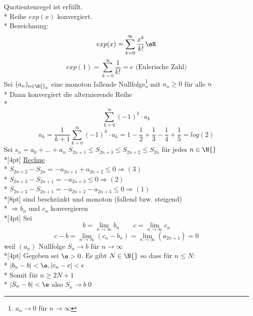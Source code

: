 \Rarr{} Quotientenregel ist erfüllt.\\*
Reihe $exp(x)$ konvergiert.\\*
Bezeichnung: $$exp(x) = \sum_{k=0}^{\infty} \frac{x^k}{k!} \eR$$
%
$$exp(1) = \sum\limits_{k=0}^{\infty} \frac{1}{k!} = e\text{ (Eulerische Zahl)}$$
Sei $(a_n)_{n \in \N{}_0}$ eine monoton fallende Nullfolge\footnote{$a_n → 0$ für $n→∞$} mit $a_n \geq 0$ für alle $n$\\*
Dann konvergiert die alternierende Reihe\\*
$$\sum_{k=0}^{\infty} (-1)^k · a_k$$
\bsp
$$a_k = \frac{1}{k + 1} \sum_{k=0}^{\infty} (-1)^k · a_k = 1 - \frac{1}{2} + \frac{1}{3} - \frac{1}{4} + \frac{1}{5}= log(2)$$
\bew
Sei $s_n = a_0 + ... + a_n$
$S_{2n + 1} \leq S_{2n + 3} \leq S_{2n + 2} \leq S_{2n}$ für jedes $n \in \N{}$\\*[4pt]
\ul{Rechne}\\*
$S_{2n + 2} - S_{2n} = - a_{2n + 1} + a_{2n + 2} \leq 0 \Rightarrow (3)$\\*
$S_{2n + 3} - S_{2n + 1} = - a_{2n + 3} \leq 0 \Rightarrow (2)$\\*
$S_{2n + 3} - S_{2n + 1} = - a_{2n + 2} - a_{2n + 3} \leq 0 \Rightarrow (1)$\\*[8pt]
sind beschränkt und monoton (fallend bzw. steigend)\\*
$\Rightarrow b_n \text{ und } c_n$ konvergieren\\*[4pt]
Sei $$b = \lim_{n \to \infty} b_n \qquad c = \lim_{n \to \infty} c_n$$
$$c - b = \lim_{n \to \infty} (c_n - b_n) = \lim_{n \to \infty} (a_{2n + 1}) = 0$$
weil $(a_n)$ Nullfolge
$S_n \to b$ für $n \to \infty$\\*[4pt]
Gegeben sei $\e > 0$. Es gibt $N \in \N{}$ so dass für $n \leq N$:\\*
$|b_n - b| < \e, |c_n - c| < \epsilon$\\*
Somit für $n \geq 2N+1 $\\*
$|S_n - b| < \e$ also $S_n \to b$\qed